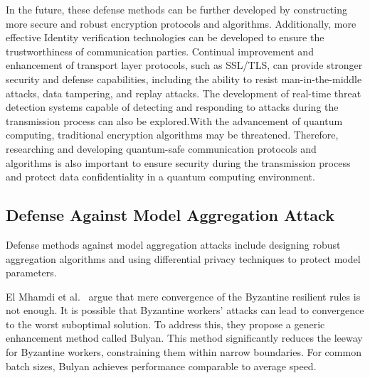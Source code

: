 \documentclass[pdflatex,sn-mathphys-num]{sn-jnl}%
\theoremstyle{thmstyleone}%
\theoremstyle{thmstyletwo}%
\theoremstyle{thmstylethree}%
\begin{document}
In the future, these defense methods can be further
developed by constructing more secure and robust
encryption protocols and algorithms. Additionally, more effective
Identity verification technologies can be developed to
ensure the trustworthiness of communication parties.
Continual improvement and enhancement of transport layer
protocols, such as SSL/TLS, can provide stronger security
and defense capabilities, including the ability to resist
man-in-the-middle attacks, data tampering, and replay
attacks. The development of real-time threat detection
systems capable of detecting and responding to attacks
during the transmission process can also be explored.With
the advancement of quantum computing, traditional
encryption algorithms may be threatened. Therefore,
researching and developing quantum-safe communication
protocols and algorithms is also important to ensure
security during the transmission process and protect data
confidentiality in a quantum computing environment.

\subsection{Defense Against Model Aggregation Attack}
Defense methods against model aggregation attacks
include designing robust aggregation algorithms and using
differential privacy techniques to protect model parameters.

El Mhamdi et al.~\cite{guerraoui2018hidden} argue that mere convergence of
the Byzantine resilient rules is not enough. It is possible
that Byzantine workers' attacks can lead to convergence
to the worst suboptimal solution. To address this, they
propose a generic enhancement method called Bulyan.
This method significantly reduces the leeway for
Byzantine workers, constraining them within narrow boundaries.
For common batch sizes, Bulyan achieves performance
comparable to average speed.
\end{document}
